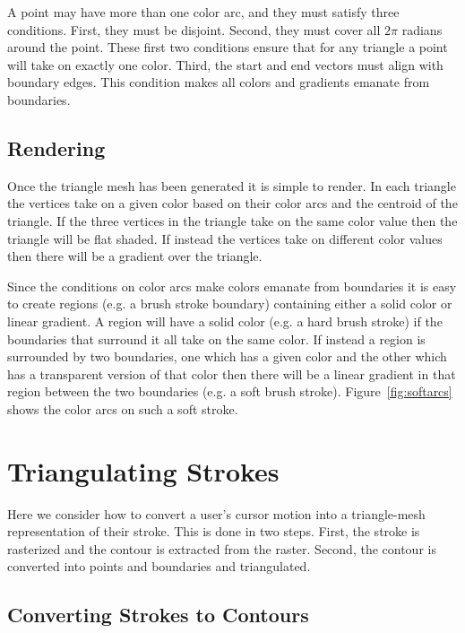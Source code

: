 \documentclass[review]{acmsiggraph}
\begin{document}
A point may have more than one color arc, and they must satisfy three conditions. First, they must be disjoint. Second,
they must cover all $2\pi$ radians around the point. These first two conditions ensure that for any
triangle a point will take on exactly one color. Third, the start and end vectors must align
with boundary edges. This condition makes all colors and gradients emanate from boundaries.

\subsection{Rendering}
Once the triangle mesh has been generated it is simple to render. In each triangle the vertices
take on a given color based on their color arcs and the centroid of the triangle. If the three
vertices in the triangle take on the same color value then the triangle will be flat shaded. If instead the 
vertices take on different color values then there will be a gradient over the triangle.

Since the conditions on color arcs make colors emanate from boundaries it is easy to create regions (e.g. a brush stroke boundary)
containing either a solid color or linear gradient. A region will have a solid color (e.g. a hard brush stroke) if the
boundaries that surround it all take on the same color. If instead a region is surrounded by
two boundaries, one which has a given color and the other which has a transparent version of that color
then there will be a linear gradient in that region between the two boundaries (e.g. a soft brush stroke).
Figure~\ref{fig:softarcs} shows the color arcs on such a soft stroke.


\section{Triangulating Strokes}

Here we consider how to convert a user's cursor motion into a triangle-mesh representation
of their stroke. This is done in two steps. First, the stroke is rasterized and the
contour is extracted from the raster. Second, the contour is converted into points and
boundaries and triangulated.

\subsection{Converting Strokes to Contours}
\end{document}
